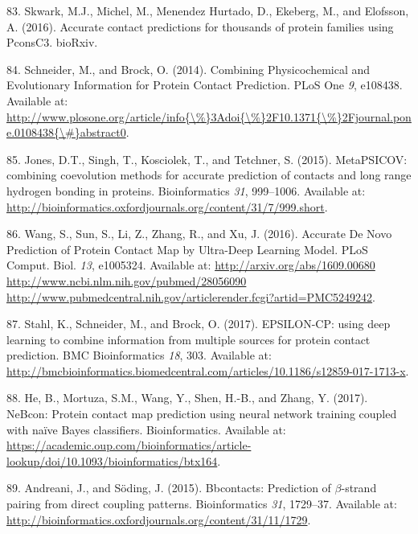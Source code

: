 \documentclass[11pt,a4paper,twoside]{book}
\theoremstyle{definition}
\theoremstyle{definition}
\theoremstyle{remark}
\begin{document}
\hypertarget{ref-Skwark2016}{}
83. Skwark, M.J., Michel, M., Menendez Hurtado, D., Ekeberg, M., and
Elofsson, A. (2016). Accurate contact predictions for thousands of
protein families using PconsC3. bioRxiv.

\hypertarget{ref-Schneider2014}{}
84. Schneider, M., and Brock, O. (2014). Combining Physicochemical and
Evolutionary Information for Protein Contact Prediction. PLoS One
\emph{9}, e108438. Available at:
\href{http://www.plosone.org/article/info\%7B/\%\%7D3Adoi\%7B/\%\%7D2F10.1371\%7B/\%\%7D2Fjournal.pone.0108438\%7B/\#\%7Dabstract0}{http://www.plosone.org/article/info\{\textbackslash{}\%\}3Adoi\{\textbackslash{}\%\}2F10.1371\{\textbackslash{}\%\}2Fjournal.pone.0108438\{\textbackslash{}\#\}abstract0}.

\hypertarget{ref-Jones2015a}{}
85. Jones, D.T., Singh, T., Kosciolek, T., and Tetchner, S. (2015).
MetaPSICOV: combining coevolution methods for accurate prediction of
contacts and long range hydrogen bonding in proteins. Bioinformatics
\emph{31}, 999--1006. Available at:
\url{http://bioinformatics.oxfordjournals.org/content/31/7/999.short}.

\hypertarget{ref-Wang2016a}{}
86. Wang, S., Sun, S., Li, Z., Zhang, R., and Xu, J. (2016). Accurate De
Novo Prediction of Protein Contact Map by Ultra-Deep Learning Model.
PLoS Comput. Biol. \emph{13}, e1005324. Available at:
\href{http://arxiv.org/abs/1609.00680\%20http://www.ncbi.nlm.nih.gov/pubmed/28056090\%20http://www.pubmedcentral.nih.gov/articlerender.fcgi?artid=PMC5249242}{http://arxiv.org/abs/1609.00680 http://www.ncbi.nlm.nih.gov/pubmed/28056090 http://www.pubmedcentral.nih.gov/articlerender.fcgi?artid=PMC5249242}.

\hypertarget{ref-Stahl2017}{}
87. Stahl, K., Schneider, M., and Brock, O. (2017). EPSILON-CP: using
deep learning to combine information from multiple sources for protein
contact prediction. BMC Bioinformatics \emph{18}, 303. Available at:
\url{http://bmcbioinformatics.biomedcentral.com/articles/10.1186/s12859-017-1713-x}.

\hypertarget{ref-He2017}{}
88. He, B., Mortuza, S.M., Wang, Y., Shen, H.-B., and Zhang, Y. (2017).
NeBcon: Protein contact map prediction using neural network training
coupled with naïve Bayes classifiers. Bioinformatics. Available at:
\url{https://academic.oup.com/bioinformatics/article-lookup/doi/10.1093/bioinformatics/btx164}.

\hypertarget{ref-Andreani2015a}{}
89. Andreani, J., and Söding, J. (2015). Bbcontacts: Prediction of
\(\beta\)-strand pairing from direct coupling patterns. Bioinformatics
\emph{31}, 1729--37. Available at:
\url{http://bioinformatics.oxfordjournals.org/content/31/11/1729}.
\end{document}
